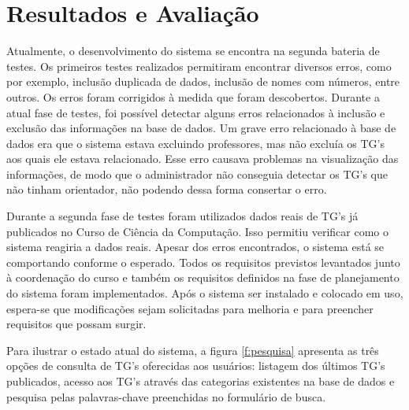 \documentclass[12pt]{article}
\begin{document}
\section{Resultados e Avalia\c{c}\~{a}o}
Atualmente, o desenvolvimento do sistema se encontra na segunda bateria de testes. Os primeiros testes realizados permitiram encontrar diversos erros, como por exemplo, inclus\~{a}o duplicada de dados, inclus\~{a}o de nomes com n\'{u}meros, entre outros. Os erros foram corrigidos \`{a} medida que foram descobertos. Durante a atual fase de testes, foi poss\'{i}vel detectar alguns erros relacionados \`{a} inclus\~{a}o e exclus\~{a}o das informa\c{c}\~{o}es na base de dados. Um grave erro relacionado \`{a} base de dados era que o sistema estava excluindo professores, mas n\~{a}o exclu\'{i}a os TG's aos quais ele estava relacionado. Esse erro causava problemas na visualiza\c{c}\~{a}o das informa\c{c}\~{o}es, de modo que o administrador n\~{a}o conseguia detectar os TG's que n\~{a}o tinham orientador, n\~{a}o podendo dessa forma consertar o erro.

Durante a segunda fase de testes foram utilizados dados reais de TG's j\'{a} publicados no Curso de Ci\^{e}ncia da Computa\c{c}\~{a}o. Isso permitiu verificar como o sistema reagiria a dados reais. Apesar dos erros encontrados, o sistema est\'{a} se comportando conforme o esperado. Todos os requisitos previstos levantados junto \`{a} coordena\c{c}\~{a}o do curso e tamb\'{e}m os requisitos definidos na fase de planejamento do sistema foram implementados. Ap\'{o}s o sistema ser instalado e colocado em uso, espera-se que modifica\c{c}\~{o}es sejam solicitadas para melhoria e para preencher requisitos que possam surgir.

Para ilustrar o estado atual do sistema, a figura \ref{f:pesquisa} apresenta as tr\^{e}s op\c{c}\~{o}es de consulta de TG's oferecidas aos usu\'{a}rios: listagem dos \'{u}ltimos TG's publicados, acesso aos TG's atrav\'{e}s das categorias existentes na base de dados e pesquisa pelas palavras-chave preenchidas no formul\'{a}rio de busca.
\end{document}

